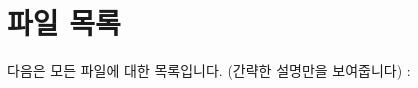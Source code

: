 \section{파일 목록}
다음은 모든 파일에 대한 목록입니다. (간략한 설명만을 보여줍니다) \+:\begin{DoxyCompactList}
\item{}
\end{DoxyCompactList}

